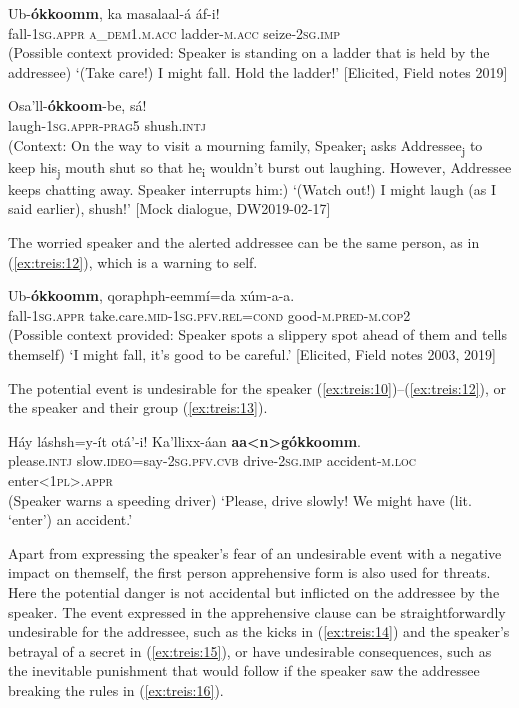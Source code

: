 \documentclass[output=paper,colorlinks,citecolor=brown,]{langscibook}
\begin{document}
\ea\label{ex:treis:10} 
\gll Ub-\textbf{ókkoomm}, 	ka 					masalaal-á 	áf-i! \\
fall-\textsc{1sg.appr}		\textsc{a\_dem1.m.acc}	ladder-\textsc{m.acc}	seize-\textsc{2sg.imp}\\
\glt (Possible context provided: Speaker is standing on a ladder that is held by the addressee) `(Take care!) I might fall. Hold the ladder!'  [Elicited, Field notes 2019]
\z 

\ea\label{ex:treis:11} 
\gll Osa'll-\textbf{ókkoom}-be, 	sá! \\
laugh-\textsc{1sg.appr-prag5} shush.\textsc{intj}\\
\glt (Context: On the way to visit a mourning family, Speaker\textsubscript{i} asks Addressee\textsubscript{j} to keep his\textsubscript{j} mouth shut so that he\textsubscript{i} wouldn't burst out laughing. However, Addressee keeps chatting away. Speaker interrupts him:) `(Watch out!) I might laugh (as I said earlier), shush!' [Mock dialogue, DW2019-02-17]\\
\z 

The worried speaker and the alerted addressee can be the same person, as in (\ref{ex:treis:12}), which is a warning to self.

\ea\label{ex:treis:12} 
\gll Ub-\textbf{ókkoomm}, 	qoraphph-eemmí=da 					xúm-a-a. \\
fall-\textsc{1sg.appr}	take.care.\textsc{mid-1sg.pfv.rel=cond}	good-\textsc{m.pred-m.cop2}\\
\glt (Possible context provided: Speaker spots a slippery spot ahead of them and tells themself) `I might fall, it's good to be careful.'  [Elicited, Field notes 2003, 2019]
\z 

The potential event is undesirable for the speaker (\ref{ex:treis:10})--(\ref{ex:treis:12}), or the speaker and their group (\ref{ex:treis:13}).

\ea\label{ex:treis:13} 
\gll Háy 			láshsh=y-ít 				otá'-i! 			Ka'llixx-áan 		\textbf{aa<n>gókkoomm}. \\
please.\textsc{intj} slow.\textsc{ideo}=say-\textsc{2sg.pfv.cvb}	drive-\textsc{2sg.imp}	accident-\textsc{m.loc}	enter\textsc{<1pl>.appr}\\
\glt (Speaker warns a speeding driver) `Please, drive slowly! We might have (lit. `enter') an accident.' \citep[4.55]{KEB2008a}
\z 

Apart from expressing the speaker's fear of an undesirable event with a negative impact on themself, the first person apprehensive form is also used for threats. Here the potential danger is not accidental but inflicted on the addressee by the speaker. The event expressed in the apprehensive clause can be straightforwardly undesirable for the addressee, such as the kicks in (\ref{ex:treis:14}) and the speaker's betrayal of a secret in (\ref{ex:treis:15}), or have undesirable consequences, such as the inevitable punishment that would follow if the speaker saw the addressee breaking the rules in (\ref{ex:treis:16}).
\end{document}
